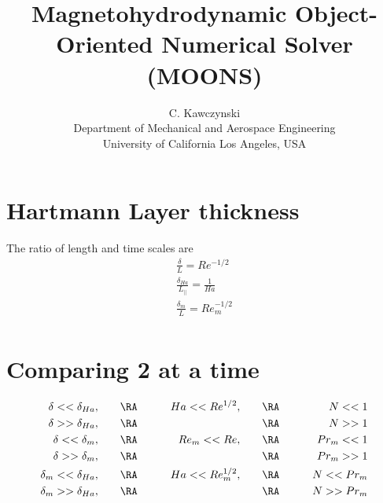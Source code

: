 \documentclass[11pt]{article}
\begin{document}
\doublespacing
\title{Magnetohydrodynamic Object-Oriented Numerical Solver (MOONS)}
\author{C. Kawczynski \\
Department of Mechanical and Aerospace Engineering \\
University of California Los Angeles, USA\\
}
\maketitle

\section{Hartmann Layer thickness}
The ratio of length and time scales are
\begin{equation}\begin{aligned}
	\frac{\delta}{L} = Re^{-1/2} \\
	\frac{\delta_{Ha}}{L_{||}} = \frac{1}{Ha} \\
	\frac{\delta_m}{L} = Re_m^{-1/2} \\
\end{aligned}\end{equation}

\section{Comparing 2 at a time}
\begin{equation}\begin{aligned}
	\delta   <<  \delta_{Ha}, & \qquad \RA \qquad & Ha   << Re^{1/2}  , \qquad & \RA \qquad & N   << 1    \\
	\delta   >>  \delta_{Ha}, & \qquad \RA \qquad &                            & \RA \qquad & N   >> 1    \\
	\delta   <<  \delta_m   , & \qquad \RA \qquad & Re_m << Re        , \qquad & \RA \qquad & Pr_m<< 1    \\
	\delta   >>  \delta_m   , & \qquad \RA \qquad &                            & \RA \qquad & Pr_m>> 1    \\
	\delta_m <<  \delta_{Ha}, & \qquad \RA \qquad & Ha   << Re_m^{1/2}, \qquad & \RA \qquad & N   << Pr_m \\
	\delta_m >>  \delta_{Ha}, & \qquad \RA \qquad &                            & \RA \qquad & N   >> Pr_m \\
\end{aligned}\end{equation}
\end{document}
